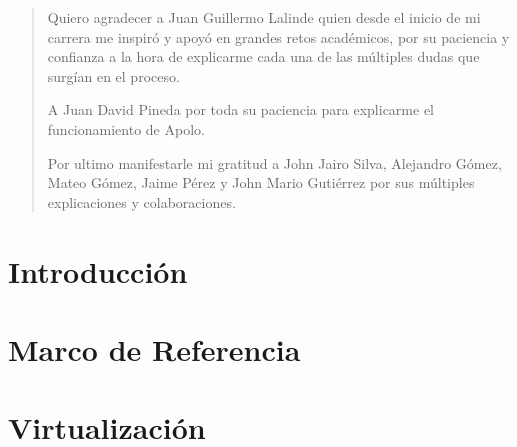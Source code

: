 \documentclass[twoside,letterpaper,12pt]{report}
\begin{document}
\newpage

\renewcommand{\abstractname}{Agradecimientos}
\begin{abstract}

	Quiero agradecer a Juan Guillermo Lalinde quien desde el inicio de mi carrera me inspiró y apoyó en grandes retos académicos, por su paciencia y confianza a la hora de explicarme cada una de las múltiples dudas que surgían en el proceso.

	A Juan David Pineda por toda su paciencia para explicarme el funcionamiento de Apolo. 

	Por ultimo manifestarle mi gratitud a John Jairo Silva, Alejandro Gómez, Mateo Gómez, Jaime Pérez y John Mario Gutiérrez por sus múltiples explicaciones y colaboraciones. 	


\end{abstract}

\newpage

\chapter{Introducción}


\chapter{Marco de Referencia}\label{ChapRef}


\chapter{Virtualización}

\end{document}
